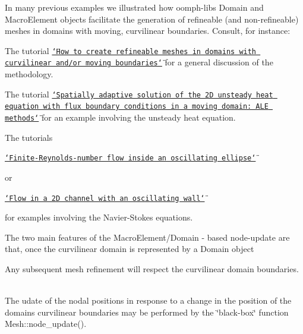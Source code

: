 In many previous examples we illustrated how {\ttfamily oomph-\/lib\textquotesingle{}s} {\ttfamily Domain} and {\ttfamily Macro\+Element} objects facilitate the generation of refineable (and non-\/refineable) meshes in domains with moving, curvilinear boundaries. Consult, for instance\+:


\begin{DoxyItemize}
\item The tutorial \href{../../../poisson/fish_poisson2/html/index.html}{\tt \char`\"{}\+How to create refineable meshes in domains with curvilinear and/or
  moving boundaries\char`\"{}} for a general discussion of the methodology. ~\newline
~\newline

\item The tutorial \href{../../../unsteady_heat/two_d_unsteady_heat_ALE/html/index.html}{\tt \char`\"{}\+Spatially adaptive solution of the 2\+D unsteady heat equation with 
  flux boundary conditions in a moving domain\+: A\+L\+E methods\char`\"{}} for an example involving the unsteady heat equation. ~\newline
~\newline

\item The tutorials ~\newline
~\newline

\begin{DoxyItemize}
\item \href{../../../navier_stokes/osc_ellipse/html/index.html}{\tt \char`\"{}\+Finite-\/\+Reynolds-\/number flow inside an oscillating ellipse\char`\"{}} ~\newline
~\newline

\end{DoxyItemize}or
\begin{DoxyItemize}
\item \href{../../../navier_stokes/collapsible_channel/html/index.html}{\tt \char`\"{}\+Flow in a 2\+D channel with an oscillating wall\char`\"{}} ~\newline
~\newline

\end{DoxyItemize}for examples involving the Navier-\/\+Stokes equations.
\end{DoxyItemize}The two main features of the {\ttfamily Macro\+Element/\+Domain} -\/ based node-\/update are that, once the curvilinear domain is represented by a {\ttfamily Domain} object
\begin{DoxyEnumerate}
\item Any subsequent mesh refinement will respect the curvilinear domain boundaries. ~\newline
~\newline

\item The udate of the nodal positions in response to a change in the position of the domain\textquotesingle{}s curvilinear boundaries may be performed by the \char`\"{}black-\/box\char`\"{} function {\ttfamily Mesh\+::node\+\_\+update()}.
\end{DoxyEnumerate}

